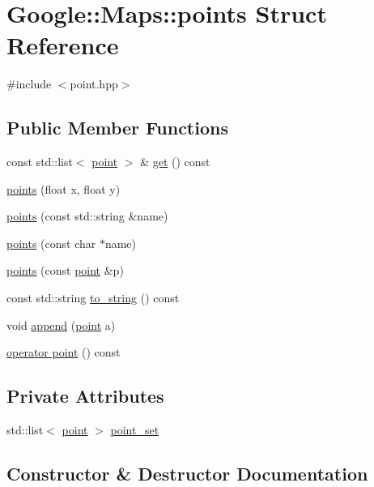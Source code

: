 \hypertarget{a00063}{}\section{Google\+:\+:Maps\+:\+:points Struct Reference}
\label{a00063}


{\ttfamily \#include $<$point.\+hpp$>$}

\subsection*{Public Member Functions}
\begin{DoxyCompactItemize}
\item 
const std\+::list$<$ \hyperlink{a00059}{point} $>$ \& \hyperlink{a00063_ade3824f6b14be94e13879c6a199feedc}{get} () const
\item 
\hyperlink{a00063_aa6fe71328e193ec7d73795733a242c8e}{points} (float x, float y)
\item 
\hyperlink{a00063_aea068cb11179bbb1ba6b1bbb0460fc07}{points} (const std\+::string \&name)
\item 
\hyperlink{a00063_a667223cf7d81616099a86abc28f165c6}{points} (const char $\ast$name)
\item 
\hyperlink{a00063_a76cef451acd0135c956398368c43f029}{points} (const \hyperlink{a00059}{point} \&p)
\item 
const std\+::string \hyperlink{a00063_a3e732652c10f7b3e6797ef4ecd7092f4}{to\+\_\+string} () const
\item 
void \hyperlink{a00063_a9c52ae880020f17d9d0bd68587a5ba51}{append} (\hyperlink{a00059}{point} a)
\item 
\hyperlink{a00063_aa52f6d50ba877a49ddfe38cd96e8248a}{operator point} () const
\end{DoxyCompactItemize}
\subsection*{Private Attributes}
\begin{DoxyCompactItemize}
\item 
std\+::list$<$ \hyperlink{a00059}{point} $>$ \hyperlink{a00063_affe83c1e22c96884077b33b98a3e7667}{point\+\_\+set}
\end{DoxyCompactItemize}


\subsection{Constructor \& Destructor Documentation}
\mbox{\label{a00063_aa6fe71328e193ec7d73795733a242c8e}} 
